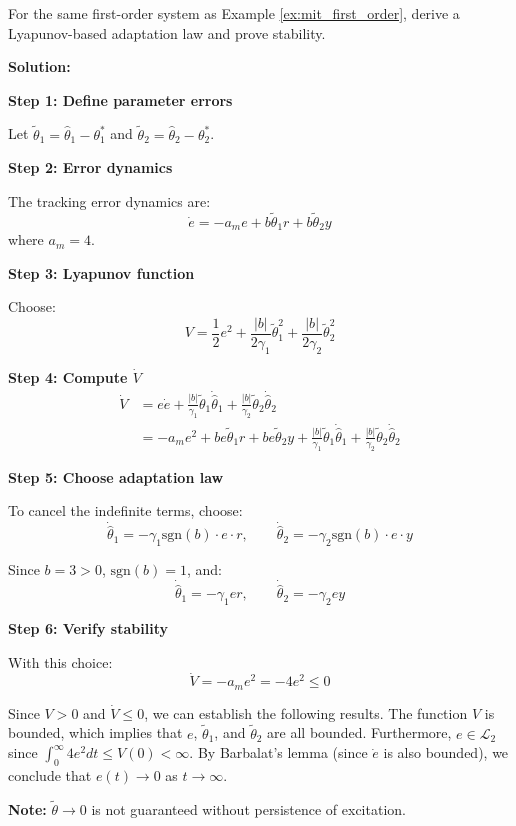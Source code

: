 \begin{examplebox}
For the same first-order system as Example \ref{ex:mit_first_order}, derive a Lyapunov-based adaptation law and prove stability.

\textbf{Solution:}

\textbf{Step 1: Define parameter errors}

Let $\tilde{\theta}_1 = \hat{\theta}_1 - \theta_1^*$ and $\tilde{\theta}_2 = \hat{\theta}_2 - \theta_2^*$.

\textbf{Step 2: Error dynamics}

The tracking error dynamics are:
\begin{equation}
\dot{e} = -a_m e + b\tilde{\theta}_1 r + b\tilde{\theta}_2 y
\end{equation}
where $a_m = 4$.

\textbf{Step 3: Lyapunov function}

Choose:
\begin{equation}
V = \frac{1}{2}e^2 + \frac{|b|}{2\gamma_1}\tilde{\theta}_1^2 + \frac{|b|}{2\gamma_2}\tilde{\theta}_2^2
\end{equation}

\textbf{Step 4: Compute $\dot{V}$}
\begin{align}
\dot{V} &= e\dot{e} + \frac{|b|}{\gamma_1}\tilde{\theta}_1\dot{\hat{\theta}}_1 + \frac{|b|}{\gamma_2}\tilde{\theta}_2\dot{\hat{\theta}}_2 \\
&= -a_m e^2 + be\tilde{\theta}_1 r + be\tilde{\theta}_2 y + \frac{|b|}{\gamma_1}\tilde{\theta}_1\dot{\hat{\theta}}_1 + \frac{|b|}{\gamma_2}\tilde{\theta}_2\dot{\hat{\theta}}_2
\end{align}

\textbf{Step 5: Choose adaptation law}

To cancel the indefinite terms, choose:
\begin{equation}
\dot{\hat{\theta}}_1 = -\gamma_1 \text{sgn}(b) \cdot e \cdot r, \qquad \dot{\hat{\theta}}_2 = -\gamma_2 \text{sgn}(b) \cdot e \cdot y
\end{equation}

Since $b = 3 > 0$, $\text{sgn}(b) = 1$, and:
\begin{equation}
\boxed{\dot{\hat{\theta}}_1 = -\gamma_1 e r, \qquad \dot{\hat{\theta}}_2 = -\gamma_2 e y}
\end{equation}

\textbf{Step 6: Verify stability}

With this choice:
\begin{equation}
\dot{V} = -a_m e^2 = -4e^2 \leq 0
\end{equation}

Since $V > 0$ and $\dot{V} \leq 0$, we can establish the following results. The function $V$ is bounded, which implies that $e$, $\tilde{\theta}_1$, and $\tilde{\theta}_2$ are all bounded. Furthermore, $e \in \mathcal{L}_2$ since $\int_0^\infty 4e^2 dt \leq V(0) < \infty$. By Barbalat's lemma (since $\dot{e}$ is also bounded), we conclude that $e(t) \to 0$ as $t \to \infty$.

\textbf{Note:} $\tilde{\theta} \to 0$ is not guaranteed without persistence of excitation.
\end{examplebox}

